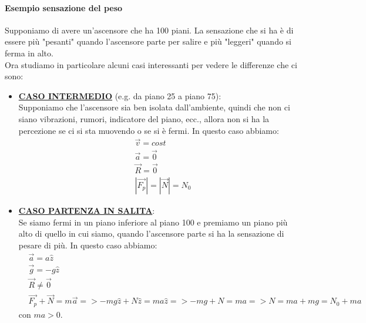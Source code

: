             \paragraph{Esempio sensazione del peso}
                Supponiamo di avere un'ascensore che ha 100 piani. La sensazione che si ha è di essere più "pesanti" quando l'ascensore parte per salire e più "leggeri" quando si ferma in alto.\\
                Ora studiamo in particolare alcuni casi interessanti per vedere le differenze che ci sono:
                \begin{itemize}
                    \item \underline{\textbf{CASO INTERMEDIO}} (e.g. da piano 25 a piano 75):\\
                    Supponiamo che l'ascensore sia ben isolata dall'ambiente, quindi che non ci siano vibrazioni, rumori, indicatore del piano, ecc., allora non si ha la percezione se ci si sta muovendo o se si è fermi.
                    In questo caso abbiamo:
                    \begin{align*}
                        &\vec{v}=cost\\
                        &\vec{a}=\vec{0}\\
                        &\vec{R}=\vec{0}\\
                        &|\vec{F_p}|=|\vec{N}|=N_0
                    \end{align*}

                    \item \underline{\textbf{CASO PARTENZA IN SALITA}}:\\
                    Se siamo fermi in un piano inferiore al piano 100 e premiamo un piano più alto di quello in cui siamo, quando l'ascensore parte si ha la sensazione di pesare di più.
                    In questo caso abbiamo:
                    \begin{align*}
                        &\vec{a}=a\hat{z}\\
                        &\vec{g}=-g\hat{z}\\
                        &\vec{R}\neq\vec{0}\\
                        &\vec{F_p}+\vec{N}=m\vec{a} => -mg\hat{z}+N\hat{z}=ma\hat{z} => -mg+N=ma => N=ma+mg = N_0 + ma
                    \end{align*}
                    con $ma > 0$.


\end{itemize}
